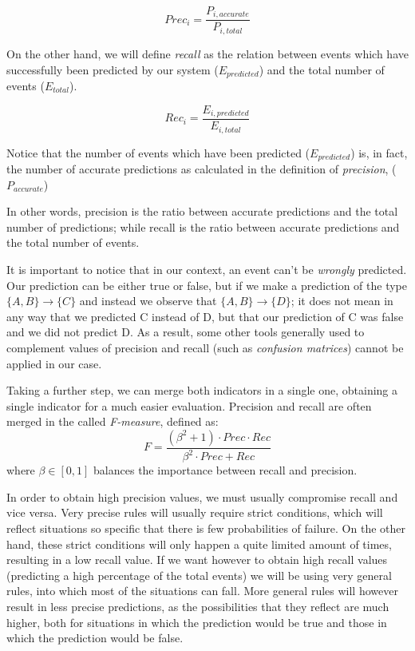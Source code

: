 \documentclass[a4paper,12pt]{article}
\begin{document}
\begin{equation}
Prec_i = \dfrac{ P_{i, accurate}}{ P_{i, total} }
\end{equation}

On the other hand, we will define \emph{recall} as the relation between events which have successfully been predicted by our system ($E_{predicted}$) and the total number of events ($E_{total}$). 

\begin{equation}
Rec_i = \dfrac{ E_{i, predicted}}{ E_{i, total} }
\end{equation}

Notice that the number of events which have been predicted ($E_{predicted}$) is, in fact, the number of accurate predictions as calculated in the definition of \emph{precision}, ($P_{accurate}$)

In other words, precision is the ratio between accurate predictions and the total number of predictions; while recall is the ratio between accurate predictions and the total number of events.

It is important to notice that in our context, an event can't be \emph{wrongly} predicted. Our prediction can be either true or false, but if we make a prediction of the type $\{A, B\} \longrightarrow \{C\}$ and instead we observe that $\{A, B\} \longrightarrow \{D\}$; it does not mean in any way that we predicted C instead of D, but that our prediction of C was false and we did not predict D. As a result, some other tools generally used to complement values of precision and recall (such as \emph{confusion matrices}) cannot be applied in our case.

Taking a further step, we can merge both indicators in a single one, obtaining a single indicator for a much easier evaluation. Precision and recall are often merged in the called \emph{F-measure}, defined as:
\begin{equation}
F = \dfrac{(\beta^{2}+1) \cdot Prec \cdot Rec}{\beta^{2} \cdot Prec+Rec}
\end{equation}
where $\beta\in [0,1]$ balances the importance between recall and precision.

In order to obtain high precision values, we must usually compromise recall and vice versa. Very precise rules will usually require strict conditions, which will reflect situations so specific that there is few probabilities of failure. On the other hand, these strict conditions will only happen a quite limited amount of times, resulting in a low recall value. If we want however to obtain high recall values (predicting a high percentage of the total events) we will be using very general rules, into which most of the situations can fall. More general rules will however result in less precise predictions, as the possibilities that they reflect are much higher, both for situations in which the prediction would be true and those in which the prediction would be false.
\end{document}
